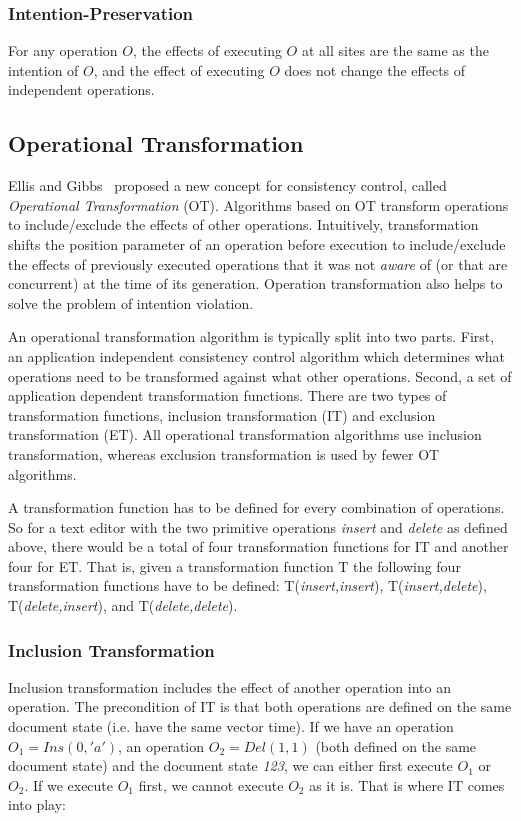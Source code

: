 \subsubsection{Intention-Preservation} 
For any operation $O$, the effects of
executing $O$ at all sites are the same as the intention of $O$, and the effect
of executing $O$ does not change the effects of independent operations.


\subsection{Operational Transformation}
{Ellis and Gibbs}~\cite{ellis} proposed a new concept for
consistency control, called \emph{Operational Transformation} (OT). 
Algorithms based on OT transform operations to include/exclude the effects of other operations. 
Intuitively, transformation shifts the position parameter of an
operation before execution to include/exclude the effects of previously executed
operations that it was not \emph{aware} of (or that are concurrent) at the
time of its generation. Operation transformation also helps to solve the
problem of intention violation.

An operational transformation algorithm is typically split into two parts. 
First, an application independent consistency control algorithm which determines 
what operations need to be transformed against what other operations. Second,
a set of application dependent transformation functions. There are two
types of transformation functions, inclusion transformation (IT) and 
exclusion transformation (ET). All operational transformation algorithms
use inclusion transformation, whereas exclusion transformation is used
by fewer OT algorithms.

A transformation function has to be defined for every combination of operations.
So for a text editor with the two primitive operations \emph{insert} and
\emph{delete} as defined above, there would be a total of four transformation
functions for IT and another four for ET. That is, given a transformation
function T the following four transformation functions have to be defined:
T(\emph{insert,insert}), T(\emph{insert,delete}), T(\emph{delete,insert}), 
and T(\emph{delete,delete}).

\subsubsection{Inclusion Transformation}
Inclusion transformation includes the effect of another operation into an
operation. The precondition of IT is that both operations are defined on the
same document state (i.e. have the same vector time). If we have an operation
$O_1 = Ins(0,'a')$, an operation $O_2 = Del(1,1)$ (both defined on the same
document state) and the document state \emph{123}, we can either first
execute $O_1$ or $O_2$. If we execute $O_1$ first, we cannot execute $O_2$
as it is. That is where IT comes into play:

